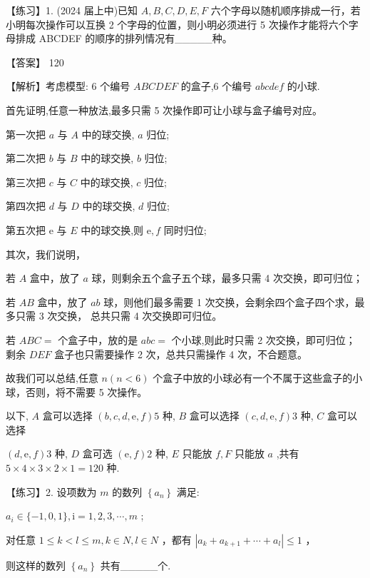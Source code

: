 \documentclass[10pt]{article}
\newcommand*\circled[1]{\tikz[baseline=(char.base)]{\node[shape=circle,draw,inner sep=1.5pt] (char) {\small #1};}}
\begin{document}
【练习】1. (2024 届上中)已知 \(A,B,C,D,E,F\) 六个字母以随机顺序排成一行，若小明每次操作可以互换 2 个字母的位置，则小明必须进行 5 次操作才能将六个字母排成 ABCDEF 的顺序的排列情况有\_\_\_\_\_种。

【答案】 120

【解析】考虑模型: 6 个编号 \({ABCDEF}\) 的盒子,6 个编号 \({abcdef}\) 的小球.

首先证明,任意一种放法,最多只需 5 次操作即可让小球与盒子编号对应。

第一次把 \(a\) 与 \(A\) 中的球交换, \(a\) 归位;

第二次把 \(b\) 与 \(B\) 中的球交换, \(b\) 归位;

第三次把 \(c\) 与 \(C\) 中的球交换, \(c\) 归位;

第四次把 \(d\) 与 \(D\) 中的球交换, \(d\) 归位;

第五次把 \(\mathrm{e}\) 与 \(E\) 中的球交换,则 \(\mathrm{e},f\) 同时归位;

其次，我们说明，

若 \(A\) 盒中，放了 \(a\) 球，则剩余五个盒子五个球，最多只需 4 次交换，即可归位；

若 \({AB}\) 盒中，放了 \({ab}\) 球，则他们最多需要 1 次交换，会剩余四个盒子四个求，最多只需 3 次交换， 总共只需 4 次交换即可归位。

若 \({ABC} =\) 个盒子中，放的是 \({abc} =\) 个小球,则此时只需 2 次交换，即可归位；剩余 \({DEF}\) 盒子也只需要操作 2 次，总共只需操作 4 次，不合题意。

故我们可以总结,任意 \(n\left( {n < 6}\right)\) 个盒子中放的小球必有一个不属于这些盒子的小球，否则，将不需要 5 次操作。

以下, \(A\) 盒可以选择 \(\left( {b,c,d,\mathrm{e},f}\right) 5\) 种, \(B\) 盒可以选择 \(\left( {c,d,\mathrm{e},f}\right) 3\) 种, \(C\) 盒可以选择

\(\left( {d,\mathrm{e},f}\right) 3\) 种, \(D\) 盒可选 \(\left( {\mathrm{e},f}\right) 2\) 种, \(E\) 只能放 \(f,F\) 只能放 \(a\) ,共有 \(5 \times  4 \times  3 \times  2 \times  1 = {120}\) 种.

【练习】2. 设项数为 \(m\) 的数列 \(\left\{  {a}_{n}\right\}\) 满足:

 \circled{1}  \({a}_{i} \in  \{  - 1,0,1\} ,\mathrm{i} = 1,2,3,\cdots ,m\) ;

 \circled{2}  对任意 \(1 \leq  k < l \leq  m,k \in  N,l \in  N\) ，都有 \(\left| {{a}_{k} + {a}_{k + 1} + \cdots  + {a}_{l}}\right|  \leq  1\) ，

则这样的数列 \(\left\{  {a}_{n}\right\}\) 共有\_\_\_\_\_个.
\end{document}
